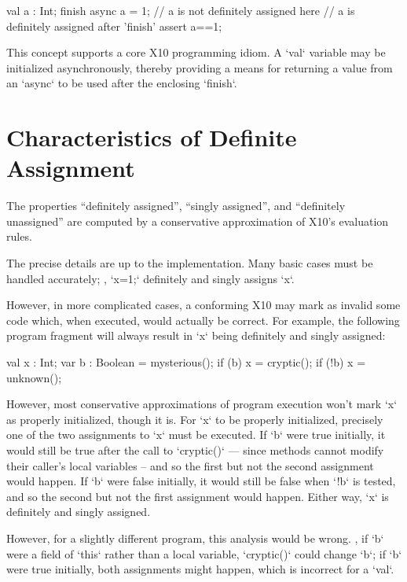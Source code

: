 \begin{ex}
\begin{xten}
val a : Int;
finish {
  async {
    a = 1;
  } 
  // a is not definitely assigned here
}
// a is definitely assigned after 'finish'
assert a==1; 
\end{xten}
\end{ex}

This concept supports a core X10 programming idiom.  A \xcd`val` variable may
be initialized asynchronously, thereby providing a means for returning a value
from an \xcd`async` to be used after the enclosing \xcd`finish`.  

\section{Characteristics of Definite Assignment}

The properties ``definitely assigned'', ``singly assigned'', and
``definitely unassigned'' are computed by a conservative approximation of
X10's evaluation rules.

The precise details are up to the implementation. 
Many basic cases must be handled accurately; \eg, \xcd`x=1;` definitely and
singly assigns \xcd`x`.  

However, in more complicated cases, a conforming X10 may mark as invalid 
some code which, when executed, would actually be correct.  
For example, the following
program fragment will always result in \xcd`x` being definitely and singly
assigned:  
\begin{xten}
val x : Int;
var b : Boolean = mysterious();
if (b) {
   x = cryptic();
}
if (!b) { 
   x = unknown();
}
\end{xten}
However, most conservative approximations of program execution won't mark
\xcd`x` as properly initialized, though it is.   For \xcd`x` to be properly
initialized, precisely one of the 
two assignments to \xcd`x` must be executed. If \xcd`b` were true initially,
it would still be true after the call to \xcd`cryptic()` --- since methods
cannot modify their caller's local variables -- and so the first but not the
second assignment would happen. If \xcd`b` were false initially, it would
still be false when \xcd`!b` is tested, and so the second but not the first
assignment would happen.  Either way, \xcd`x` is definitely and singly assigned.

However, for a slightly different program, this analysis would be wrong. \Eg,
if  \xcd`b` were a field of \xcd`this` rather than a local variable,
\xcd`cryptic()` could change \xcd`b`; if \xcd`b` were true initially, both
assignments might happen, which is incorrect for a \xcd`val`.  

